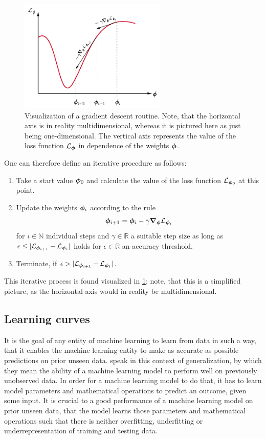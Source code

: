 \documentclass[a4paper,12pt]{report}
\begin{document}
\begin{figure}[h]
\centering
\includegraphics[width=7cm]{figures/gradientdescent.pdf}
\caption{Visualization of a gradient descent routine. Note, that the horizontal axis is in reality multidimensional, whereas it is pictured here as just being one-dimensional. The vertical axis represents the value of the loss function $\mathcal{L}_{\bm{\phi}}$ in dependence of the weights $\bm{\phi}$.}
\label{fig:gradientdescent}
\end{figure}
One can therefore define an iterative procedure as follows:
\begin{enumerate}
\item Take a start value $\bm{\phi}_0$ and calculate the value of the loss function $\mathcal{L}_{\bm{\phi}_0}$ at this point.
\item Update the weights $\bm{\phi}_{i}$ according to the rule \begin{equation}
\bm{\phi}_{i+1} = \bm{\phi}_{i} - \gamma \bm{\nabla}_{\bm{\phi}}\mathcal{L}_{\bm{\phi}_i}
\end{equation} for $i \in \mathbb{N}$ individual steps and $\gamma \in \mathbb{R}$ a suitable step size as long as $\epsilon \leq |\mathcal{L}_{\bm{\phi}_{i+1}}-\mathcal{L}_{\bm{\phi}_{i}}|$ holds for $\epsilon \in \mathbb{R}$ an accuracy threshold.
\item Terminate, if $\epsilon > |\mathcal{L}_{\bm{\phi}_{i+1}}-\mathcal{L}_{\bm{\phi}_{i}}|$.
\end{enumerate}
This iterative process is found visualized in \cref{fig:gradientdescent}; note, that this is a simplified picture, as the horizontal axis would in reality be multidimensional.

\subsection{Learning curves}\label{sec:learningcurves}
It is the goal of any entity of machine learning to learn from data in such a way, that it enables the machine learning entity to make as accurate as possible predictions on prior unseen data. \cite[p.110]{Goodfellow.2016} speak in this context of generalization, by which they mean the ability of a machine learning model to perform well on previously unobserved data. In order for a machine learning model to do that, it has to learn model parameters and mathematical operations to predict an outcome, given some input. It is crucial to a good performance of a machine learning model on prior unseen data, that the model learns those parameters and mathematical operations such that there is neither overfitting, underfitting or underrepresentation of training and testing data.
\end{document}
